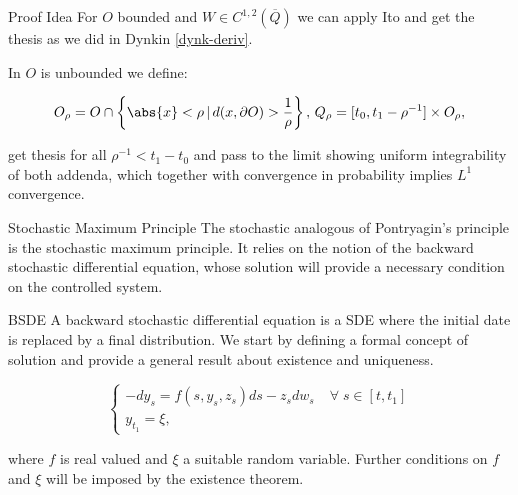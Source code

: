 \documentclass[10pt, compress]{beamer}
\let\oldforall\forall
\renewcommand{\forall}{\; \oldforall \;}
\begin{document}
\begin{frame}{Proof Idea}
    For $O$ bounded and $W\in C^{1,2}(\overline{Q})$ we can apply Ito and get the thesis as we did in Dynkin \ref{dynk-deriv}.

    In $O$ is unbounded we define:

    \[O_{\rho} = O\cap\left\{\abs{x}<\rho\,|\,d(x,\partial O)>\frac{1}{\rho}\right\},\, Q_{\rho} = [t_0,t_1-\rho^{-1}]\times O_{\rho},\]

    get thesis for all $\rho^{-1}<t_1-t_0$ and pass to the limit showing uniform integrability of both addenda, which together with convergence in probability implies $L^1$ convergence.
\end{frame}

\begin{frame}{Stochastic Maximum Principle}
    The stochastic analogous of Pontryagin’s principle is the stochastic maximum principle. It relies on the notion of the backward stochastic differential equation, whose solution will provide a necessary condition on the controlled system.
\end{frame}

\begin{frame}{BSDE}
    A backward stochastic differential equation is a SDE where the initial date is replaced by a final distribution. We start by defining a formal concept of solution and provide a general result about existence and uniqueness.

    \begin{equation}\label{2-3-defBSDE}
    \begin{cases}
        - dy_s = f(s,y_s,z_s)ds - z_sdw_s & \forall s\in[t,t_1]\\
        y_{t_1} = \xi, 
    \end{cases}
\end{equation}

where $f$ is real valued and $\xi$ a suitable random variable. Further conditions on $f$ and $\xi$ will be imposed 
by the existence theorem.
\end{frame}
\end{document}
